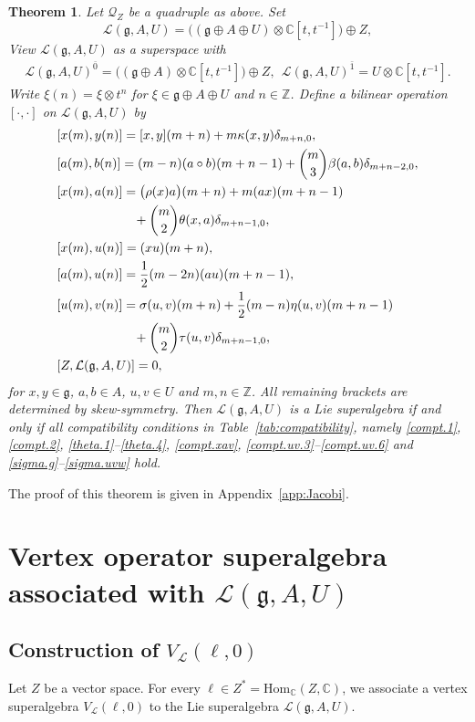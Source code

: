 \documentclass[12pt]{article}
\numberwithin{equation}{section}
\newtheorem{theorem}{Theorem}[section]
\theoremstyle{definition}
\theoremstyle{plain}
\newcommand{\bC}{\ensuremath{\mathbb{C}}}
\newcommand{\bZ}{\ensuremath{\mathbb{Z}}}
\newcommand{\ep}{\ensuremath{{\bar{0}}}}
\newcommand{\op}{\ensuremath{{\bar{1}}}}
\newcommand{\fg}{\mathfrak{g}}
\newcommand{\cQ}{\ensuremath{\mathcal{Q}}}
\newcommand{\cL}{\ensuremath{\mathcal{L}}}
\begin{document}
\begin{theorem}\label{thm:construction.L}
Let $\cQ_Z$ be a quadruple as above. Set
\begin{equation*}
    \cL(\fg,A,U)=\big((\fg\oplus A\oplus U)\otimes\bC[t,t^{-1}]\big)\oplus Z,
\end{equation*}
View $\cL(\fg,A,U)$ as a superspace with
\begin{align*}
    \cL(\fg,A,U)^{\ep}=\big((\fg\oplus A)\otimes\bC[t,t^{-1}]\big)\oplus Z,\ \ \cL(\fg,A,U)^{\op}=U\otimes\bC[t,t^{-1}].
\end{align*}
Write $\xi(n)=\xi\otimes t^n$ for $\xi\in\fg\oplus A\oplus U$ and $n\in\bZ$. Define a bilinear operation $[\cdot,\cdot]$ on $\cL(\fg,A,U)$ by
\begin{align}
    &[x(m),y(n)]=[x,y](m+n)+m\kappa(x,y)\delta_{m+n,0},\label{L:gg}\\
    &[a(m),b(n)]=(m-n)(a\circ b)(m+n-1)+\binom{m}{3}\beta(a,b)\delta_{m+n-2,0},\label{L:AA}\\
    &[x(m),a(n)]=\big(\rho(x)a\big)(m+n)+m(ax)(m+n-1)\notag\\
    &\qquad\qquad\qquad+\binom{m}{2}\theta(x,a)\delta_{m+n-1,0},\label{L:gA}\\
    &[x(m),u(n)]=(xu)(m+n),\label{L:gU}\\
    &[a(m),u(n)]=\frac12(m-2n)(au)(m+n-1),\label{L:AU}\\
    &[u(m),v(n)]=\sigma(u,v)(m+n)+\frac12(m-n)\eta(u,v)(m+n-1)\notag\\
    &\qquad\qquad\qquad+\binom{m}{2}\tau(u,v)\delta_{m+n-1,0},\label{L:UU}\\
    &[Z,\cL(\fg,A,U)]=0,\label{L:K}
\end{align}
for $x,y\in\fg$, $a,b\in A$, $u,v\in U$ and $m,n\in\bZ$. All remaining brackets are determined by skew-symmetry. Then $\cL(\fg,A,U)$ is a Lie superalgebra if and only if all compatibility conditions in Table~\ref{tab:compatibility}, namely \eqref{compt.1}, \eqref{compt.2}, \eqref{theta.1}--\eqref{theta.4}, \eqref{compt.xav}, \eqref{compt.uv.3}--\eqref{compt.uv.6} and \eqref{sigma.g}--\eqref{sigma.uvw} hold.
\end{theorem}
The proof of this theorem is given in Appendix~\ref{app:Jacobi}.

\section{Vertex operator superalgebra associated with $\cL(\fg,A,U)$}\label{sect:VOSA}
\subsection{Construction of $V_\cL(\ell,0)$}
\hspace{1.5em}Let $Z$ be a vector space. For every $\ell\in Z^*=\mathrm{Hom}_{\bC}(Z,\bC)$, we associate a vertex superalgebra $V_\cL(\ell,0)$ to the Lie superalgebra $\cL(\fg,A,U)$.
\end{document}
